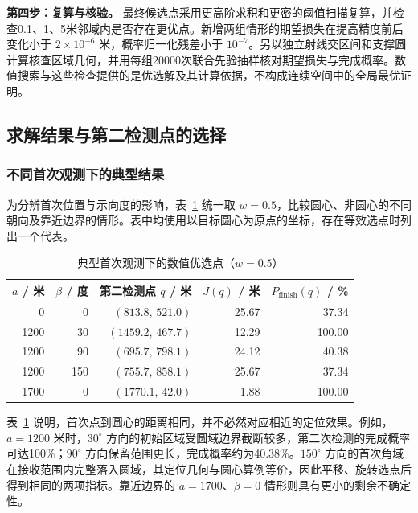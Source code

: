 \textbf{第四步：复算与核验。} 最终候选点采用更高阶求积和更密的阈值扫描复算，并检查0.1、1、5米邻域内是否存在更优点。新增两组情形的期望损失在提高精度前后变化小于 \(2\times10^{-6}\) 米，概率归一化残差小于 \(10^{-7}\)。另以独立射线交区间和支撑圆计算核查区域几何，并用每组20000次联合先验抽样核对期望损失与完成概率。数值搜索与这些检查提供的是优选解及其计算依据，不构成连续空间中的全局最优证明。

\subsection{求解结果与第二检测点的选择}

\subsubsection{不同首次观测下的典型结果}

为分辨首次位置与示向度的影响，表~\ref{tab:q2-typical-results} 统一取 \(w=0.5\)，比较圆心、非圆心的不同朝向及靠近边界的情形。表中均使用以目标圆心为原点的坐标，存在等效选点时列出一个代表。

\begin{table}[htbp]
  \centering
  \caption{典型首次观测下的数值优选点（\(w=0.5\)）}
  \label{tab:q2-typical-results}
  \small
  \renewcommand{\arraystretch}{1.08}
  \begin{tabular}{rrrrr}
    \toprule
    \(a\) / 米 & \(\beta\) / 度 & 第二检测点 \(q\) / 米 & \(J(q)\) / 米 & \(P_{\mathrm{finish}}(q)\) / \% \\
    \midrule
    0 & 0 & \((813.8,\,521.0)\) & 25.67 & 37.34 \\
    1200 & 30 & \((1459.2,\,467.7)\) & 12.29 & 100.00 \\
    1200 & 90 & \((695.7,\,798.1)\) & 24.12 & 40.38 \\
    1200 & 150 & \((755.7,\,858.1)\) & 25.67 & 37.34 \\
    1700 & 0 & \((1770.1,\,42.0)\) & 1.88 & 100.00 \\
    \bottomrule
  \end{tabular}
\end{table}

表~\ref{tab:q2-typical-results} 说明，首次点到圆心的距离相同，并不必然对应相近的定位效果。例如，\(a=1200\) 米时，\(30^\circ\) 方向的初始区域受圆域边界截断较多，第二次检测的完成概率可达100\%；\(90^\circ\) 方向保留范围更长，完成概率约为40.38\%。\(150^\circ\) 方向的首次角域在接收范围内完整落入圆域，其定位几何与圆心算例等价，因此平移、旋转选点后得到相同的两项指标。靠近边界的 \(a=1700\)、\(\beta=0\) 情形则具有更小的剩余不确定性。

